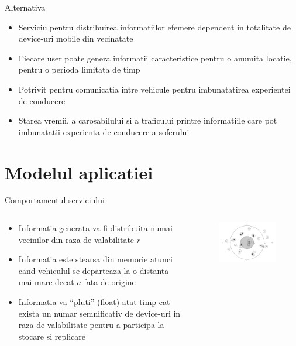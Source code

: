 \documentclass{beamer}
\begin{document}
\begin{frame}{Alternativa}
	\begin{itemize}
	  \item Serviciu pentru distribuirea informatiilor efemere dependent in
	  totalitate de device-uri mobile din vecinatate
	  \item Fiecare user poate genera informatii caracteristice pentru o anumita
	  locatie, pentru o perioda limitata de timp
	  \item Potrivit pentru comunicatia intre vehicule pentru imbunatatirea
	  experientei de conducere
	  \item Starea vremii, a carosabilului si a traficului printre informatiile
	  care pot imbunatatii experienta de conducere a soferului
	\end{itemize}
\end{frame}

\section{Modelul aplicatiei}

\begin{frame}{Comportamentul serviciului}
	 \begin{columns}
	    \begin{column}[l]{0.55\textwidth}
			\begin{itemize}
			  \item Informatia generata va fi distribuita numai vecinilor din raza de
			  valabilitate $r$
			  \item Informatia este stearsa din memorie atunci cand vehiculul se
			  departeaza la o distanta mai mare decat $a$ fata de origine
			  \item Informatia va “pluti” (float) atat timp cat exista un numar
			  semnificativ de device-uri in raza de valabilitate pentru a participa la
			  stocare si replicare
			\end{itemize}
		\end{column}
		\begin{column}[r]{0.45\textwidth}
			\begin{figure}
				\centering
		    	\includegraphics[scale=0.35]{img/anchor_zone}
		    \end{figure}
		\end{column}
	\end{columns}
\end{frame}
\end{document}
